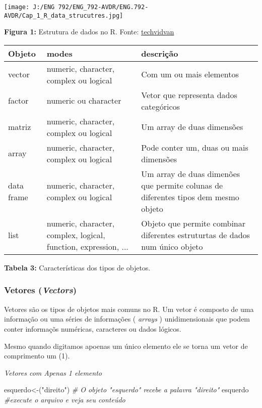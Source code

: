 \documentclass[
]{book}
\newenvironment{Shaded}{\begin{snugshade}}{\end{snugshade}}
\newcommand{\CommentTok}[1]{\textcolor[rgb]{0.56,0.35,0.01}{\textit{#1}}}
\newcommand{\NormalTok}[1]{#1}
\newcommand{\OtherTok}[1]{\textcolor[rgb]{0.56,0.35,0.01}{#1}}
\newcommand{\StringTok}[1]{\textcolor[rgb]{0.31,0.60,0.02}{#1}}
\begin{document}
\texttt{[image: J:/ENG 792/ENG\_792-AVDR/ENG.792-AVDR/Cap\_1\_R\_data\_strucutres.jpg]}

\textbf{Figura 1:} Estrutura de dados no R. Fonte: \href{https://techvidvan.com/tutorials/r-data-structures/}{techvidvan}

\begin{tabular}{l|l|l}
\hline
Objeto & modes & descrição\\
\hline
vector & numeric, character, complex ou logical & Com um ou  mais elementos\\
\hline
factor & numeric ou character & Vetor que representa dados categóricos\\
\hline
matriz & numeric, character, complex ou logical & Um array de duas dimensões\\
\hline
array & numeric, character, complex ou logical & Pode conter um, duas ou mais dimensões\\
\hline
data frame & numeric, character, complex ou logical & Um array de duas dimenões que permite colunas de diferentes tipos dem mesmo objeto\\
\hline
list & numeric, character, complex, logical, function, expression, ... & Objeto que permite combinar diferentes estruturtas de dados num único objeto\\
\hline
\end{tabular}

\textbf{Tabela 3:} Características dos tipos de objetos.

\hypertarget{vetores-vectors}{%
\subsubsection{\texorpdfstring{Vetores (\emph{Vectors})}{Vetores (Vectors)}}\label{vetores-vectors}}

Vetores são os tipos de objetos mais comuns no R. Um vetor é composto de uma informação ou uma séries de informações ( \emph{arrays} ) unidimensionais que podem conter informaçõs numéricas, caracteres ou dados lógicos.

Mesmo quando digitamos apoenas um único elemento ele se torna um vetor de comprimento um (1).

\emph{Vetores com Apenas 1 elemento}

\begin{Shaded}
\begin{Highlighting}[]
\NormalTok{esquerdo}\OtherTok{\textless{}{-}}\NormalTok{(}\StringTok{"direito"}\NormalTok{) }\CommentTok{\# O objeto "esquerdo" recebe a palavra "direito"}
\NormalTok{esquerdo }\CommentTok{\#execute o arquivo e veja seu conteúdo}
\end{Highlighting}
\end{Shaded}
\end{document}
